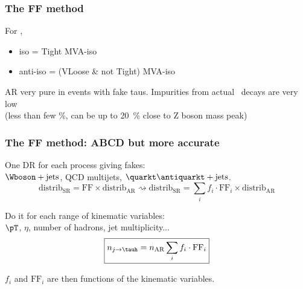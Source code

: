 \begin{frame}
\frametitle{The FF method}

For \tauh,
\begin{itemize}
\item iso = Tight MVA-iso
\item anti-iso = (VLoose \& not Tight) MVA-iso
\end{itemize}

\manip AR very pure in events with fake taus.
\manip Impurities from actual \tauh\ decays are very low\\(less than few \%, can be up to \SI{20}{\%} close to Z boson mass peak)
\end{frame}

\begin{frame}
\frametitle{The FF method: ABCD but more accurate}
\manip One DR for each process giving fakes:\\$\Wboson+\text{jets}$, QCD multijets, $\quarkt\antiquarkt+\text{jets}$.
\begin{equation*}
\text{distrib}_\text{SR} = \mathrm{FF} \times \text{distrib}_\text{AR}
\rightsquigarrow
\text{distrib}_\text{SR} =\sum_i f_i \cdot \mathrm{FF}_i \times \text{distrib}_\text{AR}
\end{equation*}

\pause
\manip Do it for each range of kinematic variables:\\
\qquad $\pT$, $\eta$, number of hadrons, jet multiplicity...
\begin{equation*}
\boxed{n_{j\to\tauh} = n_\text{AR}\sum_i f_i \cdot \mathrm{FF}_i}
\end{equation*}

\pause
\manip $f_i$ and $\mathrm{FF}_i$ are then functions of the kinematic variables.
\end{frame}

